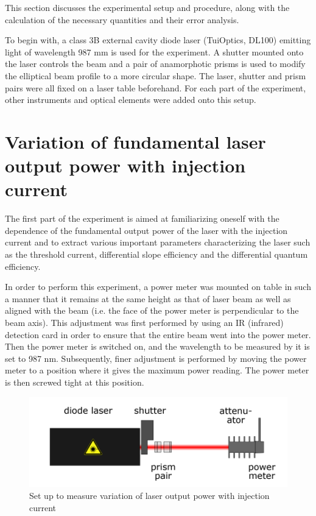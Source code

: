 This section discusses the experimental setup and procedure, along with the calculation of the necessary quantities and their error analysis. 

To begin with, a class 3B external cavity diode laser (TuiOptics, DL100) emitting light of wavelength 987 mm is used for the experiment. A shutter mounted onto the laser controls the beam and a pair of anamorphotic prisms is used to modify the elliptical beam profile to a more circular shape. The laser, shutter and prism pairs were all fixed on a laser table beforehand. For each part of the experiment, other instruments and optical elements were added onto this setup.

\section{Variation of fundamental laser output power with injection current}
The first part of the experiment is aimed at familiarizing oneself with the dependence of the fundamental output power of the laser with the injection current and to extract various important parameters characterizing the laser such as the threshold current, differential slope efficiency and the differential quantum efficiency. 

In order to perform this experiment, a power meter was mounted on table in such a manner that it remains at the same height as that of laser beam as well as aligned with the beam (i.e. the face of the power meter is perpendicular to the beam axis). This adjustment was first performed by using an IR (infrared) detection card in order to ensure that the entire beam went into the power meter. Then the power meter is switched on, and the wavelength to be measured by it is set to 987 nm. Subsequently, finer adjustment is performed by moving the power meter to a position where it gives the maximum power reading. The power meter is then screwed tight at this position.

\begin{figure}[H]
\includegraphics[scale=0.4]{./imagesandplots/pic1.png}
\centering
\caption{Set up to measure variation of laser output power with injection current \cite{UB}}
\label{figexpt1}
\end{figure}

